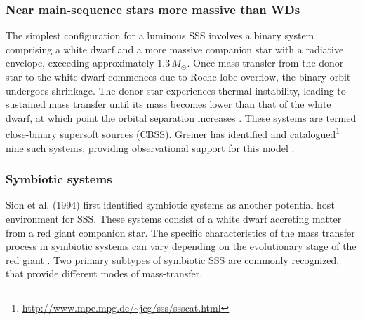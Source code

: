 			\subsubsection{Near main-sequence stars more massive than WDs}
				The simplest configuration for a luminous SSS involves a binary system comprising a white dwarf and a more massive companion star with a radiative envelope, exceeding approximately $1.3\,M_{\odot}$. Once mass transfer from the donor star to the white dwarf commences due to Roche lobe overflow, the binary orbit undergoes shrinkage. The donor star experiences thermal instability, leading to sustained mass transfer until its mass becomes lower than that of the white dwarf, at which point the orbital separation increases \cite{paczynski71}. These systems are termed close-binary supersoft sources (CBSS). Greiner has identified and catalogued\footnote{\url{http://www.mpe.mpg.de/~jcg/sss/ssscat.html}} nine such systems, providing observational support for this model \cite{greiner2000catalog}.
				
			\subsubsection{Symbiotic systems}
				Sion et al. (1994) first identified symbiotic systems as another potential host environment for SSS. These systems consist of a white dwarf accreting matter from a red giant companion star. The specific characteristics of the mass transfer process in symbiotic systems can vary depending on the evolutionary stage of the red giant \cite{sion94}. Two primary subtypes of symbiotic SSS are commonly recognized, that provide different modes of mass-transfer.
				
